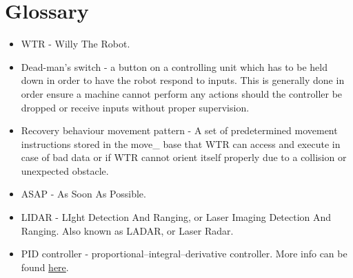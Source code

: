 \section{Glossary}
\begin{itemize}
\item \label{trm::WTR} WTR - Willy The Robot.
\item \label{trm::dms} Dead-man's switch - a button on a controlling unit which has to be held down in order to have the robot respond to inputs. This is generally done in order ensure a machine cannot perform any actions should the controller be dropped or receive inputs without proper supervision.
\item \label{trm::recpat}Recovery behaviour movement pattern - A set of predetermined movement instructions stored in the move\_ base that WTR can access and execute in case of bad data or if WTR cannot orient itself properly due to a collision or unexpected obstacle.
\item \label{trm::ASAP} ASAP - As Soon As Possible.
\item \label{trm::LIDAR} LIDAR - LIght Detection And Ranging, or Laser Imaging Detection And Ranging. Also known as LADAR, or Laser Radar.
\item \label{trm::PIcontroller} PID controller - proportional–integral–derivative controller. More info can be found \href{https://en.wikipedia.org/wiki/PID_controller}{here}.
\end{itemize}